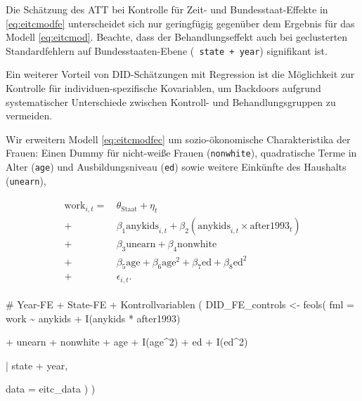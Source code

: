 \documentclass[
  a4paper,
  DIV=11,
  oneside]{scrreprt}
\newenvironment{Shaded}{\begin{snugshade}}{\end{snugshade}}
\newcommand{\AttributeTok}[1]{\textcolor[rgb]{0.40,0.45,0.13}{#1}}
\newcommand{\CommentTok}[1]{\textcolor[rgb]{0.37,0.37,0.37}{#1}}
\newcommand{\DecValTok}[1]{\textcolor[rgb]{0.68,0.00,0.00}{#1}}
\newcommand{\FunctionTok}[1]{\textcolor[rgb]{0.28,0.35,0.67}{#1}}
\newcommand{\NormalTok}[1]{\textcolor[rgb]{0.00,0.23,0.31}{#1}}
\newcommand{\OtherTok}[1]{\textcolor[rgb]{0.00,0.23,0.31}{#1}}
\newcommand{\SpecialCharTok}[1]{\textcolor[rgb]{0.37,0.37,0.37}{#1}}
\begin{document}
Die Schätzung des ATT bei Kontrolle für Zeit- und Bundesstaat-Effekte in
\eqref{eq:eitcmodfe} unterscheidet sich nur geringfügig gegenüber dem
Ergebnis für das Modell \eqref{eq:eitcmod}. Beachte, dass der
Behandlungseffekt auch bei geclusterten Standardfehlern auf
Bundesstaaten-Ebene (\texttt{\textbar{}\ state\ +\ year}) signifikant
ist.

Ein weiterer Vorteil von DID-Schätzungen mit Regression ist die
Möglichkeit zur Kontrolle für individuen-spezifische Kovariablen, um
Backdoors aufgrund systematischer Unterschiede zwischen Kontroll- und
Behandlungsgruppen zu vermeiden.

Wir erweitern Modell \eqref{eq:eitcmodfec} um sozio-ökonomische
Charakteristika der Frauen: Einen Dummy für nicht-weiße Frauen
(\texttt{nonwhite}), quadratische Terme in Alter (\texttt{age}) und
Ausbildungsniveau (\texttt{ed}) sowie weitere Einkünfte des Haushalts
(\texttt{unearn}),

\begin{align}
  \begin{split}
    \text{work}_{i,t} =&\, \theta_\text{Staat} + \eta_t \\
    +&\, \beta_1 \text{anykids}_{i,t} + \beta_2 (\text{anykids}_{i,t} \times \text{after1993}_t) \\
    +&\, \beta_3 \text{unearn} + \beta_4 \text{nonwhite} \\
    +&\, \beta_5 \text{age} + \beta_6 \text{age}^2 + \beta_7 \text{ed} + \beta_8 \text{ed}^2 \\
    +&\, \epsilon_{i,t}.
    \end{split}\label{eq:eitcmodfec}
\end{align}

\begin{Shaded}
\begin{Highlighting}[]
\CommentTok{\# Year{-}FE + State{-}FE + Kontrollvariablen}
\NormalTok{(}
\NormalTok{  DID\_FE\_controls }\OtherTok{\textless{}{-}} \FunctionTok{feols}\NormalTok{(}
    \AttributeTok{fml =}\NormalTok{ work }\SpecialCharTok{\textasciitilde{}}\NormalTok{ anykids }\SpecialCharTok{+} \FunctionTok{I}\NormalTok{(anykids }\SpecialCharTok{*}\NormalTok{ after1993) }
    
    \SpecialCharTok{+}\NormalTok{ unearn }\SpecialCharTok{+}\NormalTok{ nonwhite }
    \SpecialCharTok{+}\NormalTok{ age }\SpecialCharTok{+} \FunctionTok{I}\NormalTok{(age}\SpecialCharTok{\^{}}\DecValTok{2}\NormalTok{)}
    \SpecialCharTok{+}\NormalTok{ ed }\SpecialCharTok{+} \FunctionTok{I}\NormalTok{(ed}\SpecialCharTok{\^{}}\DecValTok{2}\NormalTok{)}
    
    \SpecialCharTok{|}\NormalTok{ state }\SpecialCharTok{+}\NormalTok{ year, }
    
    \AttributeTok{data =}\NormalTok{ eitc\_data}
\NormalTok{  )}
\NormalTok{)}
\end{Highlighting}
\end{Shaded}
\end{document}
